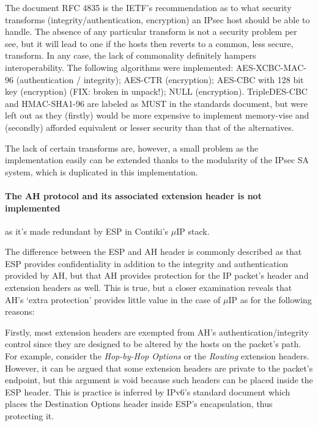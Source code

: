 \documentclass[final,a4paper,twoside,11pt,onecolumn]{report}
\begin{document}
The document RFC 4835 is the IETF's recommendation as to what security transforms (integrity/authentication, encryption) an IPsec host should be able to handle. The absence of any particular transform is not a security problem per see, but it will lead to one if the hosts then reverts to a common, less secure, transform. In any case, the lack of commonality definitely hampers interoperability. The following algorithms were implemented: AES-XCBC-MAC-96\cite{rfc3566} (authentication / integrity); AES-CTR\cite{rfc3686} (encryption); AES-CBC with 128 bit key\cite{rfc3602} (encryption) (FIX: broken in unpack!); NULL\cite{rfc2410} (encryption). TripleDES-CBC\cite{rfc2451} and HMAC-SHA1-96\cite{rfc2404} are labeled as MUST in the standards document\cite{rfc4835}, but were left out as they (firstly) would be more expensive to implement memory-vise and (secondly) afforded equivalent or lesser security than that of the alternatives.

The lack of certain transforms are, however, a small problem as the implementation easily can be extended thanks to the modularity of the IPsec SA system, which is duplicated in this implementation.

\paragraph{The AH protocol and its associated extension header is not implemented} as it's made redundant by ESP in Contiki's $\mu$IP stack.

The difference between the ESP and AH header is commonly described as that ESP provides confidentiality in addition to the integrity and authentication provided by AH, but that AH provides protection for the IP packet's header and extension headers as well. This is true, but a closer examination reveals that AH's `extra protection' provides little value in the case of $\mu$IP as for the following reasons:

Firstly, most extension headers are exempted from AH's authentication/integrity control since they are designed to be altered by the hosts on the packet's path. For example, consider the \emph{Hop-by-Hop Options} or the \emph{Routing} extension headers. However, it can be argued that some extension headers are private to the packet's endpoint, but this argument is void because such headers can be placed inside the ESP header. This is practice is inferred by IPv6's standard document\citep[p.13]{rfc2460} which places the Destination Options header inside ESP's encapsulation, thus protecting it.
\end{document}
